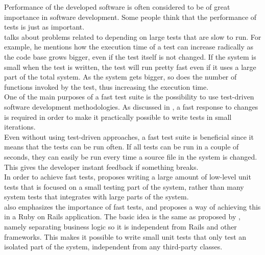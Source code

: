\label{sec:theory_time}

Performance of the developed software is often considered to be of great
importance in software development. Some people think that the
performance of tests is just as important.\\

\citet{video:fast_slow_test} talks about problems related to depending
on large tests that are slow to run. For example, he mentions how the
execution time of a test can increase radically as the code base grows
bigger, even if the test itself is not changed. If the system is small
when the test is written, the test will run pretty fast even if it uses
a large part of the total system. As the system gets bigger, so does the
number of functions invoked by the test, thus increasing the execution
time.\\

One of the main purposes of a fast test suite is the possibility to use
test-driven software development methodologies. As discussed in
, a fast response to changes is required in order to make
it practically possible to write tests in small iterations.\\

Even without using test-driven approaches, a fast test suite is
beneficial since it means that the tests can be run often. If all tests
can be run in a couple of seconds, they can easily be run every time a
source file in the system is changed. This gives the developer instant
feedback if something breaks.\\

In order to achieve fast tests, \citeauthor{video:fast_slow_test}
proposes writing a large amount of low-level unit tests that is focused
on a small testing part of the system, rather than many system tests
that integrates with large parts of the system.\\

\citet{video:fast_rails_tests} also emphasizes the importance of fast
tests, and proposes a way of achieving this in a Ruby on Rails
application. The basic idea is the same as proposed by
\citeauthor{video:fast_slow_test}, namely separating business logic so
it is independent from Rails and other frameworks. This makes it
possible to write small unit tests that only test an isolated part of
the system, independent from any third-party classes.\\
